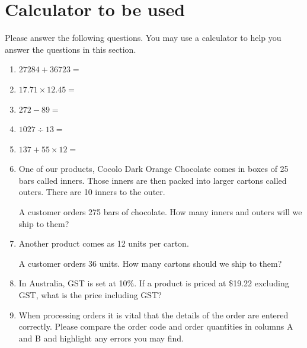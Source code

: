 \documentclass[a4paper]{article}
\begin{document}
\section{Calculator to be used}
Please answer the following questions. You may use a calculator to help you answer the questions in this section.
\begin{enumerate}\addtolength{\itemsep}{1\baselineskip}

\item \begin{math} 27284 + 36723 = \end{math} 
\item \begin{math} 17.71 \times 12.45 = \end{math} 
\item \begin{math} 272 - 89 = \end{math} 
\item \begin{math} 1027 \div 13 = \end{math} 
\item \begin{math} 137 + 55 \times 12 = \end{math}  
\item One of our products, Cocolo Dark Orange Chocolate comes in boxes of 25 bars called inners. Those inners are then packed into larger cartons called outers. There are 10 inners to the outer. 

A customer orders 275 bars of chocolate. How many inners and outers will we ship to them? 


\item Another product comes as 12 units per carton. 

A customer orders 36 units. How many cartons should we ship to them?


\item In Australia, GST is set at 10\%. If a product is priced at \$19.22 excluding GST, what is the price including GST?


\item When processing orders it is vital that the details of the
  order are entered correctly. Please compare the order code and order quantities in columns A
  and B and highlight any errors you may find.


\end{enumerate}
\end{document}
